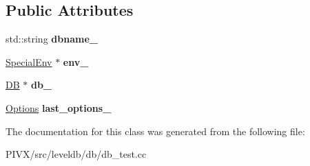 \subsection*{Public Attributes}
\begin{DoxyCompactItemize}
\item 
\mbox{\label{classleveldb_1_1_d_b_test_ab7eb9815f522ad154816d72d1cc23a86}} 
std\+::string {\bfseries dbname\+\_\+}
\item 
\mbox{\label{classleveldb_1_1_d_b_test_ae6bb66675fe5419ed647efd1bfd332f8}} 
\mbox{\hyperlink{classleveldb_1_1_special_env}{Special\+Env}} $\ast$ {\bfseries env\+\_\+}
\item 
\mbox{\label{classleveldb_1_1_d_b_test_a2c3db8773f1aa15128432a87489b0d5a}} 
\mbox{\hyperlink{classleveldb_1_1_d_b}{DB}} $\ast$ {\bfseries db\+\_\+}
\item 
\mbox{\label{classleveldb_1_1_d_b_test_adc05df912917d8de411d0672af04330f}} 
\mbox{\hyperlink{structleveldb_1_1_options}{Options}} {\bfseries last\+\_\+options\+\_\+}
\end{DoxyCompactItemize}


The documentation for this class was generated from the following file\+:\begin{DoxyCompactItemize}
\item 
P\+I\+V\+X/src/leveldb/db/db\+\_\+test.\+cc\end{DoxyCompactItemize}
